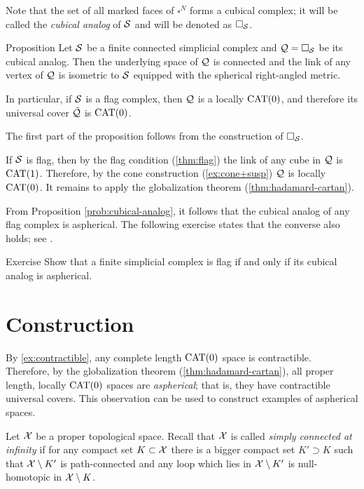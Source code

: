 Note that the set of all marked faces of $\square^{N}$
forms a cubical complex;
it will be called 
the \emph{cubical analog} of $\mathcal{S}$
and will be denoted as $\square_{\mathcal{S}}$.

\begin{thm}{Proposition}\label{prob:cubical-analog}
Let $\mathcal{S}$ be a finite connected simplicial complex
and $\mathcal{Q}=\square_{\mathcal{S}}$ be its cubical analog.
Then the underlying space of $\mathcal{Q}$ is connected 
and the link of any vertex of $\mathcal{Q}$
is isometric to  ${\mathcal{S}}$
equipped with the spherical right-angled metric.

In particular, if $\mathcal{S}$ is a flag complex,
then $\mathcal{Q}$ is a locally $\mathrm{CAT}(0)$,
and therefore its universal cover $\tilde{\mathcal{Q}}$ is $\mathrm{CAT}(0)$.
\end{thm}

The first part of the proposition follows 
from the construction of $\square_{\mathcal{S}}$.

If ${\mathcal{S}}$ is flag, 
then by the flag condition (\ref{thm:flag}) 
the link of any cube in $\mathcal{Q}$ is $\mathrm{CAT}(1)$.
Therefore, by the cone construction (\ref{ex:cone+susp})
$\mathcal{Q}$
is locally $\mathrm{CAT}(0)$.
It remains to apply the globalization theorem 
(\ref{thm:hadamard-cartan}).
\qeds

From Proposition \ref{prob:cubical-analog}, 
it follows that the cubical analog
of any flag complex is aspherical.
The following exercise states that the  converse also holds; see \cite[5.4]{davis-2001}.

\begin{thm}{Exercise}\label{ex:flag-aspherical}
Show that a finite simplicial complex is flag 
if and only if its cubical analog is aspherical.
\end{thm}

\section{Construction}

By \ref{ex:contractible}, any complete length $\mathrm{CAT}(0)$ space is contractible.
Therefore, by  the globalization theorem (\ref{thm:hadamard-cartan}), all proper length, locally $\mathrm{CAT}(0)$ spaces 
are \emph{aspherical};
that is, they have contractible universal covers.
This observation can be used to construct examples of  aspherical spaces. 

Let $\mathcal{X}$ be a proper topological space.
Recall that $\mathcal{X}$ is called 
\emph{simply connected at infinity} 
if for any compact set $K\subset\mathcal{X}$
there is a bigger compact set $K'\supset K$
such that  $\mathcal{X}\setminus K'$ is path-connected 
and any loop which lies in $\mathcal{X}\setminus K'$
is null-homotopic in  $\mathcal{X}\setminus K$.

